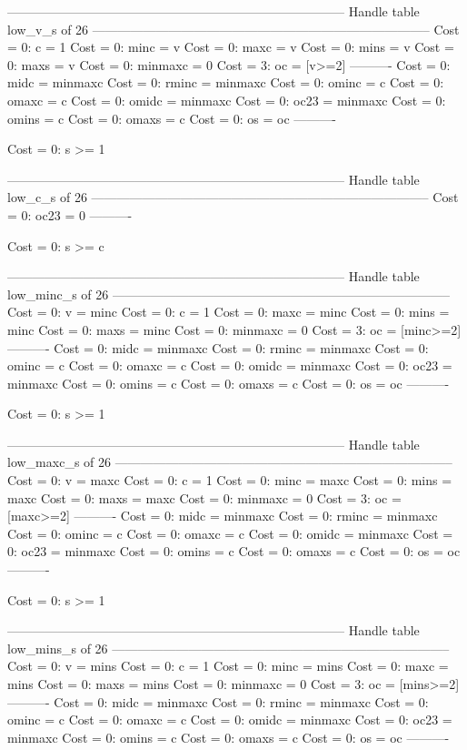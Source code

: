 --------------------------------------------------------------------------------
Handle table low_v_s of 26
--------------------------------------------------------------------------------
Cost =  0:  c       = 1
Cost =  0:  minc    = v
Cost =  0:  maxc    = v
Cost =  0:  mins    = v
Cost =  0:  maxs    = v
Cost =  0:  minmaxc = 0
Cost =  3:  oc      = [v>=2]
----------
Cost =  0:  midc    = minmaxc
Cost =  0:  rminc   = minmaxc
Cost =  0:  ominc   = c
Cost =  0:  omaxc   = c
Cost =  0:  omidc   = minmaxc
Cost =  0:  oc23    = minmaxc
Cost =  0:  omins   = c
Cost =  0:  omaxs   = c
Cost =  0:  os      = oc
----------

Cost =  0:  s >= 1

--------------------------------------------------------------------------------
Handle table low_c_s of 26
--------------------------------------------------------------------------------
Cost =  0:  oc23 = 0
----------

Cost =  0:  s >= c

--------------------------------------------------------------------------------
Handle table low_minc_s of 26
--------------------------------------------------------------------------------
Cost =  0:  v       = minc
Cost =  0:  c       = 1
Cost =  0:  maxc    = minc
Cost =  0:  mins    = minc
Cost =  0:  maxs    = minc
Cost =  0:  minmaxc = 0
Cost =  3:  oc      = [minc>=2]
----------
Cost =  0:  midc    = minmaxc
Cost =  0:  rminc   = minmaxc
Cost =  0:  ominc   = c
Cost =  0:  omaxc   = c
Cost =  0:  omidc   = minmaxc
Cost =  0:  oc23    = minmaxc
Cost =  0:  omins   = c
Cost =  0:  omaxs   = c
Cost =  0:  os      = oc
----------

Cost =  0:  s >= 1

--------------------------------------------------------------------------------
Handle table low_maxc_s of 26
--------------------------------------------------------------------------------
Cost =  0:  v       = maxc
Cost =  0:  c       = 1
Cost =  0:  minc    = maxc
Cost =  0:  mins    = maxc
Cost =  0:  maxs    = maxc
Cost =  0:  minmaxc = 0
Cost =  3:  oc      = [maxc>=2]
----------
Cost =  0:  midc    = minmaxc
Cost =  0:  rminc   = minmaxc
Cost =  0:  ominc   = c
Cost =  0:  omaxc   = c
Cost =  0:  omidc   = minmaxc
Cost =  0:  oc23    = minmaxc
Cost =  0:  omins   = c
Cost =  0:  omaxs   = c
Cost =  0:  os      = oc
----------

Cost =  0:  s >= 1

--------------------------------------------------------------------------------
Handle table low_mins_s of 26
--------------------------------------------------------------------------------
Cost =  0:  v       = mins
Cost =  0:  c       = 1
Cost =  0:  minc    = mins
Cost =  0:  maxc    = mins
Cost =  0:  maxs    = mins
Cost =  0:  minmaxc = 0
Cost =  3:  oc      = [mins>=2]
----------
Cost =  0:  midc    = minmaxc
Cost =  0:  rminc   = minmaxc
Cost =  0:  ominc   = c
Cost =  0:  omaxc   = c
Cost =  0:  omidc   = minmaxc
Cost =  0:  oc23    = minmaxc
Cost =  0:  omins   = c
Cost =  0:  omaxs   = c
Cost =  0:  os      = oc
----------

